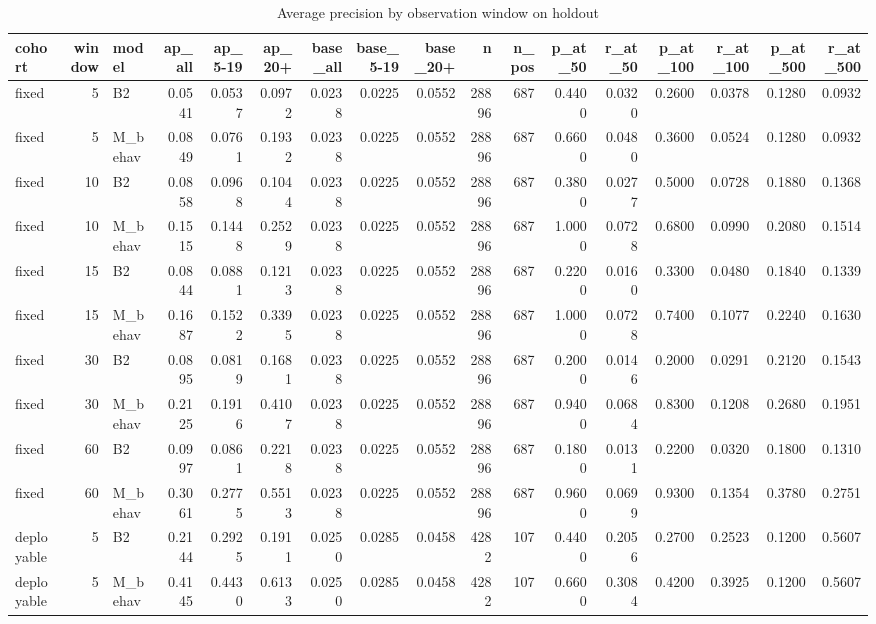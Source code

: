 \begin{table}
\caption{Average precision by observation window on holdout}
\label{tab:tab_latency_final}
\begin{tabular}{lrlrrrrrrrrrrrrrr}
\toprule
cohort & window & model & ap\_all & ap\_5-19 & ap\_20+ & base\_all & base\_5-19 & base\_20+ & n & n\_pos & p\_at\_50 & r\_at\_50 & p\_at\_100 & r\_at\_100 & p\_at\_500 & r\_at\_500 \\
\midrule
fixed & 5 & B2 & 0.0541 & 0.0537 & 0.0972 & 0.0238 & 0.0225 & 0.0552 & 28896 & 687 & 0.4400 & 0.0320 & 0.2600 & 0.0378 & 0.1280 & 0.0932 \\
fixed & 5 & M\_behav & 0.0849 & 0.0761 & 0.1932 & 0.0238 & 0.0225 & 0.0552 & 28896 & 687 & 0.6600 & 0.0480 & 0.3600 & 0.0524 & 0.1280 & 0.0932 \\
fixed & 10 & B2 & 0.0858 & 0.0968 & 0.1044 & 0.0238 & 0.0225 & 0.0552 & 28896 & 687 & 0.3800 & 0.0277 & 0.5000 & 0.0728 & 0.1880 & 0.1368 \\
fixed & 10 & M\_behav & 0.1515 & 0.1448 & 0.2529 & 0.0238 & 0.0225 & 0.0552 & 28896 & 687 & 1.0000 & 0.0728 & 0.6800 & 0.0990 & 0.2080 & 0.1514 \\
fixed & 15 & B2 & 0.0844 & 0.0881 & 0.1213 & 0.0238 & 0.0225 & 0.0552 & 28896 & 687 & 0.2200 & 0.0160 & 0.3300 & 0.0480 & 0.1840 & 0.1339 \\
fixed & 15 & M\_behav & 0.1687 & 0.1522 & 0.3395 & 0.0238 & 0.0225 & 0.0552 & 28896 & 687 & 1.0000 & 0.0728 & 0.7400 & 0.1077 & 0.2240 & 0.1630 \\
fixed & 30 & B2 & 0.0895 & 0.0819 & 0.1681 & 0.0238 & 0.0225 & 0.0552 & 28896 & 687 & 0.2000 & 0.0146 & 0.2000 & 0.0291 & 0.2120 & 0.1543 \\
fixed & 30 & M\_behav & 0.2125 & 0.1916 & 0.4107 & 0.0238 & 0.0225 & 0.0552 & 28896 & 687 & 0.9400 & 0.0684 & 0.8300 & 0.1208 & 0.2680 & 0.1951 \\
fixed & 60 & B2 & 0.0997 & 0.0861 & 0.2218 & 0.0238 & 0.0225 & 0.0552 & 28896 & 687 & 0.1800 & 0.0131 & 0.2200 & 0.0320 & 0.1800 & 0.1310 \\
fixed & 60 & M\_behav & 0.3061 & 0.2775 & 0.5513 & 0.0238 & 0.0225 & 0.0552 & 28896 & 687 & 0.9600 & 0.0699 & 0.9300 & 0.1354 & 0.3780 & 0.2751 \\
deployable & 5 & B2 & 0.2144 & 0.2925 & 0.1911 & 0.0250 & 0.0285 & 0.0458 & 4282 & 107 & 0.4400 & 0.2056 & 0.2700 & 0.2523 & 0.1200 & 0.5607 \\
deployable & 5 & M\_behav & 0.4145 & 0.4430 & 0.6133 & 0.0250 & 0.0285 & 0.0458 & 4282 & 107 & 0.6600 & 0.3084 & 0.4200 & 0.3925 & 0.1200 & 0.5607 \\

\end{tabular}
\end{table}
